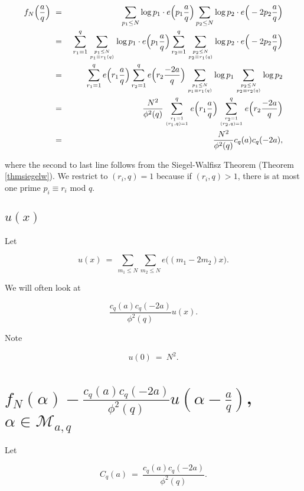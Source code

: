 \documentclass[12pt,letterpaper]{report}
\newcommand\be{\begin{equation}}
\newcommand\ee{\end{equation}}
\newcommand\bea{\begin{eqnarray}}
\newcommand\eea{\end{eqnarray}}
\begin{document}
\bea f_N\Big( \frac{a}{q} \Big) & \ = \ & \sum_{p_1 \le N} \log
p_1 \cdot e\Big(p_1\frac{a}{q}\Big) \sum_{p_2 \le N} \log p_2
\cdot e\Big(-2p_2\frac{a}{q}\Big) \nonumber\\ & \ = \ & \sum_{r_1
= 1}^q \sum_{p_1 \le N \atop p_1 \equiv r_1 (q)} \log p_1 \cdot
e\Big(p_1\frac{a}{q}\Big) \sum_{r_2 = 1}^q \sum_{p_2 \le N \atop
p_2 \equiv r_1 (q)} \log p_2 \cdot e\Big(-2p_2\frac{a}{q}\Big)
\nonumber\\ & \ = \ & \sum_{r_1 = 1}^q e\Big( r_1\frac{a}{q} \Big)
\sum_{r_2 = 1}^q e\Big( r_2\frac{-2a}{q} \Big) \sum_{p_1 \le N
\atop p_1 \equiv r_1 (q)} \log p_1 \sum_{p_2 \le N \atop p_2
\equiv r_2 (q)} \log p_2 \nonumber\\ & \ = \ &
\frac{N^2}{\phi^2(q)} \sum_{r_1 = 1 \atop (r_1,q)=1}^q e\Big(
r_1\frac{a}{q} \Big) \sum_{r_2 = 1 \atop (r_2,q)=1}^q e\Big(
r_2\frac{-2a}{q} \Big)\nonumber\\ & \ = \ & \frac{N^2}{\phi^2(q)}
c_q(a)c_q(-2a), \eea

where the second to last line follows from the Siegel-Walfisz
Theorem (Theorem \ref{thmsiegelw}). We restrict to $(r_i,q) = 1$
because if $(r_i,q) > 1$, there is at most one prime $p_i \equiv
r_i$ mod $q$.



\subsection{$u(x)$}

Let

\be u(x) \ = \ \sum_{m_1 \le N} \sum_{m_2 \le N} e\Big( (m_1 -
2m_2)x \Big). \ee

We will often look at

\be \frac{c_q(a) c_q(-2a)}{\phi^2(q)} u(x). \ee

Note

\be u(0) \ = \ N^2. \ee




\section{$f_N(\alpha) - \frac{c_q(a) c_q(-2a)}{\phi^2(q)}
u(\alpha - \frac{a}{q})$, $\alpha \in \mathcal{M}_{a,q}$}

Let

\be C_q(a) \ = \ \frac{c_q(a) c_q(-2a)}{\phi^2(q)}. \ee
\end{document}
